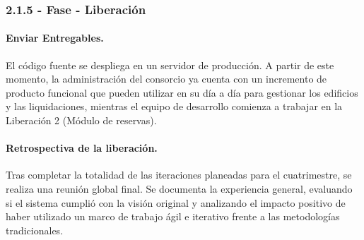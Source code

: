 \subsubsection{2.1.5 - Fase - Liberación}

\paragraph{Enviar Entregables.}
El código fuente se despliega en un servidor de producción. A partir de este momento, la administración del consorcio ya cuenta con un incremento de producto funcional que pueden utilizar en su día a día para gestionar los edificios y las liquidaciones, mientras el equipo de desarrollo comienza a trabajar en la Liberación 2 (Módulo de reservas). 

\paragraph{Retrospectiva de la liberación.}
Tras completar la totalidad de las iteraciones planeadas para el cuatrimestre, se realiza una reunión global final. Se documenta la experiencia general, evaluando si el sistema cumplió con la visión original y analizando el impacto positivo de haber utilizado un marco de trabajo ágil e iterativo frente a las metodologías tradicionales.
